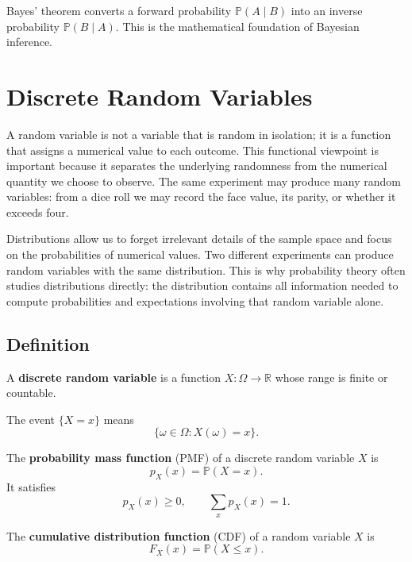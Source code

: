 \begin{remark}
Bayes' theorem converts a forward probability $\mathbb{P}(A\mid B)$ into an inverse probability $\mathbb{P}(B\mid A)$. This is the mathematical foundation of Bayesian inference.
\end{remark}

\section{Discrete Random Variables}


A random variable is not a variable that is random in isolation; it is a function that assigns a numerical value to each outcome. This functional viewpoint is important because it separates the underlying randomness from the numerical quantity we choose to observe. The same experiment may produce many random variables: from a dice roll we may record the face value, its parity, or whether it exceeds four.

Distributions allow us to forget irrelevant details of the sample space and focus on the probabilities of numerical values. Two different experiments can produce random variables with the same distribution. This is why probability theory often studies distributions directly: the distribution contains all information needed to compute probabilities and expectations involving that random variable alone.

\subsection{Definition}

\begin{definition}
A \textbf{discrete random variable} is a function $X:\Omega\to\mathbb{R}$ whose range is finite or countable.
\end{definition}

The event $\{X=x\}$ means
\[
    \{\omega\in\Omega:X(\omega)=x\}.
\]

\begin{definition}
The \textbf{probability mass function} (PMF) of a discrete random variable $X$ is
\[
    p_X(x)=\mathbb{P}(X=x).
\]
It satisfies
\[
    p_X(x)\geq 0,
    \qquad
    \sum_x p_X(x)=1.
\]
\end{definition}

\begin{definition}
The \textbf{cumulative distribution function} (CDF) of a random variable $X$ is
\[
    F_X(x)=\mathbb{P}(X\leq x).
\]
\end{definition}

